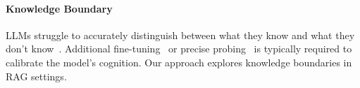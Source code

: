 \paragraph{Knowledge Boundary}

% 
% 
LLMs struggle to accurately distinguish between what they know and what they don't know~\cite{yin2023large,kapoor2024large,yin2024benchmarking}.
% 
Additional fine-tuning~\cite{kapoor-etal-2024-calibration} or precise probing~\cite{cheng2024unified} is typically required to calibrate the model's cognition. 
% 
Our approach explores knowledge boundaries in RAG settings.






